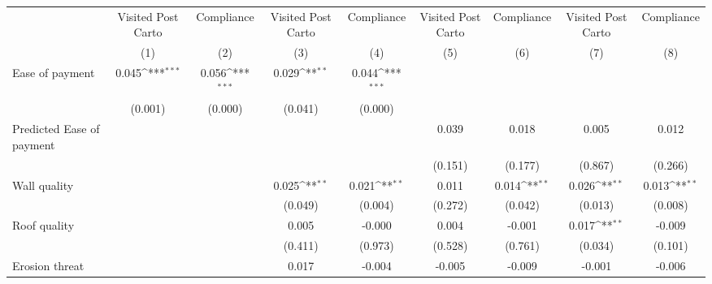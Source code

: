 {
\def\sym#1{\ifmmode^{#1}\else\(^{#1}\)\fi}
\begin{tabular}{l*{8}{c}}
\toprule
                &\multicolumn{1}{c}{Visited Post Carto}&\multicolumn{1}{c}{Compliance}&\multicolumn{1}{c}{Visited Post Carto}&\multicolumn{1}{c}{Compliance}&\multicolumn{1}{c}{Visited Post Carto}&\multicolumn{1}{c}{Compliance}&\multicolumn{1}{c}{Visited Post Carto}&\multicolumn{1}{c}{Compliance}\\
                &\multicolumn{1}{c}{(1)}         &\multicolumn{1}{c}{(2)}         &\multicolumn{1}{c}{(3)}         &\multicolumn{1}{c}{(4)}         &\multicolumn{1}{c}{(5)}         &\multicolumn{1}{c}{(6)}         &\multicolumn{1}{c}{(7)}         &\multicolumn{1}{c}{(8)}         \\
\midrule
Ease of payment &    0.045\sym{***}&    0.056\sym{***}&    0.029\sym{**} &    0.044\sym{***}&                  &                  &                  &                  \\
                &  (0.001)         &  (0.000)         &  (0.041)         &  (0.000)         &                  &                  &                  &                  \\
Predicted Ease of payment&                  &                  &                  &                  &    0.039         &    0.018         &    0.005         &    0.012         \\
                &                  &                  &                  &                  &  (0.151)         &  (0.177)         &  (0.867)         &  (0.266)         \\
Wall quality    &                  &                  &    0.025\sym{**} &    0.021\sym{**} &    0.011         &    0.014\sym{**} &    0.026\sym{**} &    0.013\sym{**} \\
                &                  &                  &  (0.049)         &  (0.004)         &  (0.272)         &  (0.042)         &  (0.013)         &  (0.008)         \\
Roof quality    &                  &                  &    0.005         &   -0.000         &    0.004         &   -0.001         &    0.017\sym{**} &   -0.009         \\
                &                  &                  &  (0.411)         &  (0.973)         &  (0.528)         &  (0.761)         &  (0.034)         &  (0.101)         \\
Erosion threat  &                  &                  &    0.017         &   -0.004         &   -0.005         &   -0.009         &   -0.001         &   -0.006         \\

\end{tabular}}
